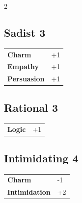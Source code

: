 \begin{multicols}{2}
\begin{tcolorbox}
\end{tcolorbox}

\begin{tcolorbox}
    \subsection*{Sadist \hfill \small{3 }}
    \tcblower




\begin{tabular}{@{}ll@{}}
    \textbf{Charm} & +1\\
    \textbf{Empathy} & +1\\
    \textbf{Persuasion} & +1\\
\end{tabular}


\end{tcolorbox}

\begin{tcolorbox}
    \subsection*{Rational \hfill \small{3 }}
    \tcblower




\begin{tabular}{@{}ll@{}}
    \textbf{Logic} & +1\\
\end{tabular}


\end{tcolorbox}

\begin{tcolorbox}
    \subsection*{Intimidating \hfill \small{4 }}
    \tcblower




\begin{tabular}{@{}ll@{}}
    \textbf{Charm} & -1\\
    \textbf{Intimidation} & +2\\
\end{tabular}


\end{tcolorbox}
\end{multicols}
